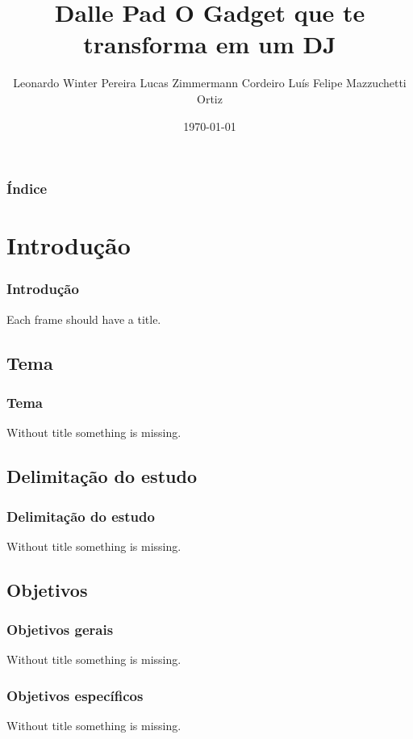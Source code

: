\documentclass[hyperref={pdfpagelabels=false}]{beamer}
\title{Dalle Pad \newline O Gadget que te transforma em um DJ}
\author{Leonardo Winter Pereira \newline Lucas Zimmermann Cordeiro \newline Luís Felipe Mazzuchetti Ortiz}
\date{\today}
\begin{document}
    \begin{frame}
        \titlepage
    \end{frame}

    \begin{frame}\frametitle{Índice}
        \tableofcontents
    \end{frame}

        \section{Introdução}

            \begin{frame}\frametitle{Introdução}
                Each frame should have a title.
            \end{frame}

            \subsection{Tema}

                \begin{frame}\frametitle{Tema}
                    Without title something is missing.
                \end{frame}

            \subsection{Delimitação do estudo}

                \begin{frame}\frametitle{Delimitação do estudo}
                    Without title something is missing.
                \end{frame}

            \subsection{Objetivos}

                \begin{frame}\frametitle{Objetivos gerais}
                    Without title something is missing.
                \end{frame}

                \begin{frame}\frametitle{Objetivos específicos}
                    Without title something is missing.
                \end{frame}
\end{document}
